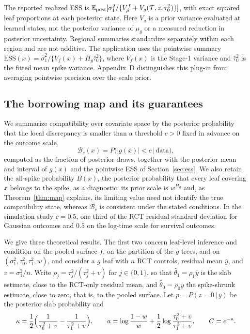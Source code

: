 \documentclass[11pt]{article}
\newcommand{\E}{\mathbb{E}}
\newcommand{\given}{\,\vert\,}
\theoremstyle{definition}
\theoremstyle{plain}
\begin{document}
The reported realized ESS is $\E_{\rm post}[\sigma_1^2/\{V_\mu^f+V_g(\mathcal T,z,\tau_0^2)\}]$, with exact squared leaf proportions at each posterior state. Here $V_g$ is a prior variance evaluated at learned states, not the posterior variance of $\mu_g$ or a measured reduction in posterior uncertainty. Regional summaries standardize separately within each region and are not additive. The application uses the pointwise summary $\mathrm{ESS}(x)=\hat\sigma_1^2/\{V_f(x)+H_g\bar\tau_0^2\}$, where $V_f(x)$ is the Stage-1 variance and $\bar\tau_0^2$ is the fitted mean spike variance. Appendix~D distinguishes this plug-in from averaging pointwise precision over the scale prior.

\subsection{The borrowing map and its guarantees}
\label{sec:map}

We summarize compatibility over covariate space by the posterior probability that the local discrepancy is smaller than a threshold $c>0$ fixed in advance on the outcome scale,
\begin{equation}
\mathcal B_c(x)=P\bigl(|g(x)|<c\given\text{data}\bigr),
\label{eq:map}
\end{equation}
computed as the fraction of posterior draws, together with the posterior mean and interval of $g(x)$ and the pointwise ESS of Section~\ref{sec:ess}. We also retain the all-spike probability $B(x)$, the posterior probability that every leaf covering $x$ belongs to the spike, as a diagnostic; its prior scale is $w^{H_g}$ and, as Theorem~\ref{thm:map} explains, its limiting value need not identify the true compatibility state, whereas $\mathcal B_c$ is consistent under the stated conditions. In the simulation study $c=0.5$, one third of the RCT residual standard deviation for Gaussian outcomes and $0.5$ on the log-time scale for survival outcomes.

We give three theoretical results. The first two concern leaf-level inference and condition on the pooled surface $f$, on the partition of the $g$ trees, and on $(\sigma_1^2,\tau_0^2,\tau_1^2,w)$, and consider a $g$ leaf with $n$ RCT controls, residual mean $\bar y$, and $v=\sigma_1^2/n$. Write $\rho_j=\tau_j^2/(\tau_j^2+v)$ for $j\in\{0,1\}$, so that $\hat\theta_1=\rho_1\bar y$ is the slab estimate, close to the RCT-only residual mean, and $\hat\theta_0=\rho_0\bar y$ the spike-shrunk estimate, close to zero, that is, to the pooled surface. Let $p=P(z=0\given\bar y)$ be the posterior slab probability and
\begin{equation}
\kappa=\frac{1}{2}\Bigl(\frac{1}{\tau_0^2+v}-\frac{1}{\tau_1^2+v}\Bigr),\qquad
a=\log\frac{1-w}{w}+\frac{1}{2}\log\frac{\tau_0^2+v}{\tau_1^2+v},\qquad C=e^{-a}.
\label{eq:kappa}
\end{equation}
\end{document}
